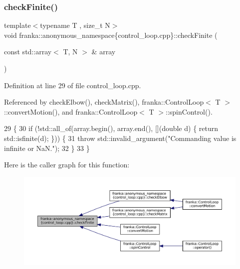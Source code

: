 \subsubsection{\texorpdfstring{check\+Finite()}{checkFinite()}}
{\footnotesize\ttfamily template$<$typename T , size\+\_\+t N$>$ \\
void franka\+::anonymous\+\_\+namespace\{control\+\_\+loop.\+cpp\}\+::check\+Finite (\begin{DoxyParamCaption}\item[{const std\+::array$<$ T, N $>$ \&}]{array }\end{DoxyParamCaption})\hspace{0.3cm}{\ttfamily [inline]}}



Definition at line 29 of file control\+\_\+loop.\+cpp.



Referenced by check\+Elbow(), check\+Matrix(), franka\+::\+Control\+Loop$<$ T $>$\+::convert\+Motion(), and franka\+::\+Control\+Loop$<$ T $>$\+::spin\+Control().


\begin{DoxyCode}
29                                                      \{
30   \textcolor{keywordflow}{if} (!std::all\_of(array.begin(), array.end(), [](\textcolor{keywordtype}{double} d) \{ \textcolor{keywordflow}{return} std::isfinite(d); \})) \{
31     \textcolor{keywordflow}{throw} std::invalid\_argument(\textcolor{stringliteral}{"Commanding value is infinite or NaN."});
32   \}
33 \}
\end{DoxyCode}
Here is the caller graph for this function\+:
\nopagebreak
\begin{figure}[H]
\begin{center}
\leavevmode
\includegraphics[width=350pt]{namespacefranka_1_1anonymous__namespace_02control__loop_8cpp_03_af284e9c97573a00e6fc31f0c716d6add_icgraph}
\end{center}
\end{figure}
\mbox{\label{namespacefranka_1_1anonymous__namespace_02control__loop_8cpp_03_aff0fa7aeeb1c7339b142b323b30b1146}} 
